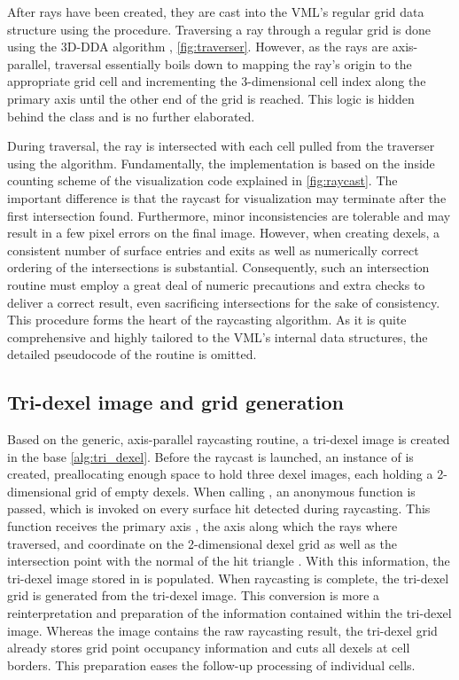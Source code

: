 After rays have been created, they are cast into the VML's regular grid data structure using the  procedure.
Traversing a ray through a regular grid is done using the 3D-DDA algorithm \cite{3DDDA}, \cf \cref{fig:traverser}.
However, as the rays are axis-parallel, traversal essentially boils down to mapping the ray's origin to the appropriate grid cell and incrementing the 3-dimensional cell index along the primary axis until the other end of the grid is reached.
This logic is hidden behind the  class and is no further elaborated.

During traversal, the ray is intersected with each cell pulled from the traverser using the  algorithm.
Fundamentally, the implementation is based on the inside counting scheme of the visualization code explained in \cref{fig:raycast}.
The important difference is that the raycast for visualization may terminate after the first intersection found.
Furthermore, minor inconsistencies are tolerable and may result in a few pixel errors on the final image.
However, when creating dexels, a consistent number of surface entries and exits as well as numerically correct ordering of the intersections is substantial.
Consequently, such an intersection routine must employ a great deal of numeric precautions and extra checks to deliver a correct result, even sacrificing intersections for the sake of consistency.
This procedure forms the heart of the raycasting algorithm.
As it is quite comprehensive and highly tailored to the VML's internal data structures, the detailed pseudocode of the  routine is omitted.


\subsection{Tri-dexel image and grid generation}
\label{sec:tri_dexel_dexel_image_generation}

Based on the generic, axis-parallel raycasting routine, a tri-dexel image is created in the base \cref{alg:tri_dexel}.
Before the raycast is launched, an instance of  is created, preallocating enough space to hold three dexel images, each holding a 2-dimensional grid of empty dexels.
When calling , an anonymous function is passed, which is invoked on every surface hit detected during raycasting.
This function receives the primary axis , \ie the axis along which the rays where traversed,  and  coordinate on the 2-dimensional dexel grid as well as the intersection point  with the normal of the hit triangle .
With this information, the tri-dexel image stored in  is populated.
When raycasting is complete, the tri-dexel grid is generated from the tri-dexel image.
This conversion is more a reinterpretation and preparation of the information contained within the tri-dexel image.
Whereas the image contains the raw raycasting result, the tri-dexel grid already stores grid point occupancy information and cuts all dexels at cell borders.
This preparation eases the follow-up processing of individual cells.


